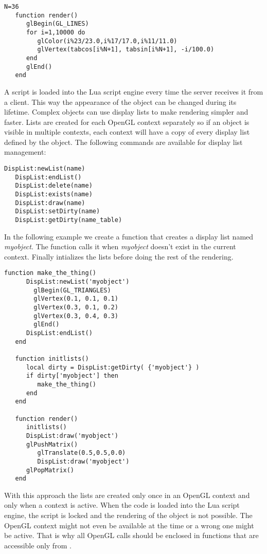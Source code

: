 \begin{Verbatim}[fontsize=\scriptsize,gobble=3]
   N=36
   function render()
      glBegin(GL_LINES)
      for i=1,10000 do
         glColor(i%23/23.0,i%17/17.0,i%11/11.0)
         glVertex(tabcos[i%N+1], tabsin[i%N+1], -i/100.0)
      end
      glEnd()
   end
\end{Verbatim}

A script is loaded into the Lua script engine every time the server receives it
from a client. This way the appearance of the object can be changed during its
lifetime. Complex objects can use display lists to make rendering simpler and 
faster. Lists are created for each OpenGL context separately so if an object
is visible in multiple contexts, each context will have a copy of every
display list defined by the object.
The following commands are available for display list management:

\begin{Verbatim}[fontsize=\scriptsize,gobble=3]
   DispList:newList(name)
   DispList:endList()
   DispList:delete(name)
   DispList:exists(name)
   DispList:draw(name)
   DispList:setDirty(name)
   DispList:getDirty(name_table)
\end{Verbatim}

In the following example we create a function that creates a display list named
{\em myobject}. The function  calls it when {\em myobject}
doesn't exist in the current context. Finally  intializes the
lists before doing the rest of the rendering.

\begin{Verbatim}[fontsize=\scriptsize,gobble=3]
   function make_the_thing()
      DispList:newList('myobject')
        glBegin(GL_TRIANGLES)
        glVertex(0.1, 0.1, 0.1)
        glVertex(0.3, 0.1, 0.2)
        glVertex(0.3, 0.4, 0.3)
        glEnd()
      DispList:endList()
   end

   function initlists()
      local dirty = DispList:getDirty( {'myobject'} )
      if dirty['myobject'] then
         make_the_thing()
      end
   end

   function render()
      initlists()
      DispList:draw('myobject')
      glPushMatrix()
         glTranslate(0.5,0.5,0.0)
         DispList:draw('myobject')
      glPopMatrix()
   end
\end{Verbatim}

With this approach the lists are created only once in an OpenGL context and
only when a context is active. When the code is loaded into the Lua script
engine, the script is locked and the rendering of the object is not possible.
The OpenGL context might not even be available at the time or a wrong one might
be active. That is why all OpenGL calls should be enclosed in functions that
are accessible only from .

